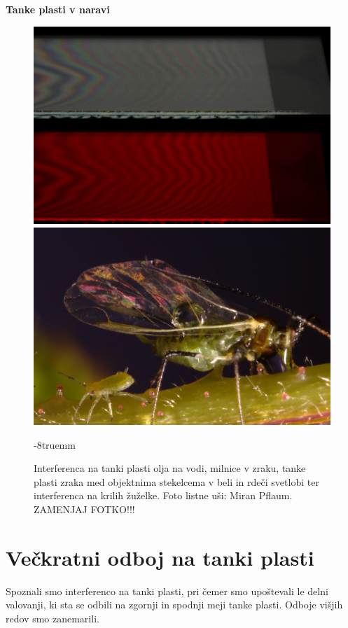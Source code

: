 \begin{example}{\bf Tanke plasti v naravi}
\begin{figure}[!h]
\includegraphics[width=7truecm]{slike/06_photo_zrak.jpg}\hfill
\includegraphics[width=7truecm]{slike/06_photo_us.jpg}
\caption{Interferenca na tanki plasti olja na vodi, milnice v zraku, tanke plasti 
zraka med objektnima stekelcema v beli in rdeči svetlobi ter interferenca
na krilih žuželke. Foto listne uši: Miran Pflaum. 
ZAMENJAJ FOTKO!!!}
\vglue-8truemm
\label{fig:06_Photos}
\end{figure}

\end{example}

\section{Večkratni odboj na tanki plasti}
Spoznali smo interferenco na tanki plasti, pri čemer
smo upoštevali le delni valovanji, ki sta se odbili na zgornji in 
spodnji meji tanke plasti. Odboje višjih redov smo zanemarili.

